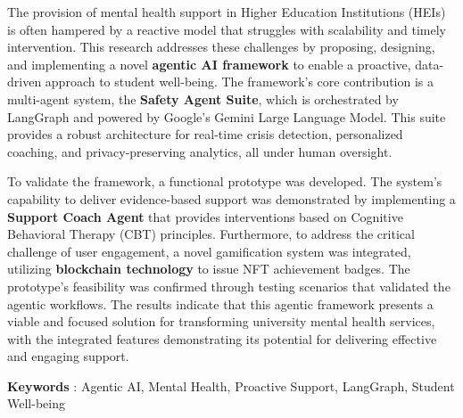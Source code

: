 	The provision of mental health support in Higher Education Institutions (HEIs) is often hampered by a reactive model that struggles with scalability and timely intervention. This research addresses these challenges by proposing, designing, and implementing a novel \textbf{agentic AI framework} to enable a proactive, data-driven approach to student well-being. The framework’s core contribution is a multi-agent system, the \textbf{Safety Agent Suite}, which is orchestrated by LangGraph and powered by Google’s Gemini Large Language Model. This suite provides a robust architecture for real-time crisis detection, personalized coaching, and privacy-preserving analytics, all under human oversight.

	To validate the framework, a functional prototype was developed. The system's capability to deliver evidence-based support was demonstrated by implementing a \textbf{Support Coach Agent} that provides interventions based on Cognitive Behavioral Therapy (CBT) principles. Furthermore, to address the critical challenge of user engagement, a novel gamification system was integrated, utilizing \textbf{blockchain technology} to issue NFT achievement badges. The prototype's feasibility was confirmed through testing scenarios that validated the agentic workflows. The results indicate that this agentic framework presents a viable and focused solution for transforming university mental health services, with the integrated features demonstrating its potential for delivering effective and engaging support.

\noindent\textbf{Keywords} : Agentic AI, Mental Health, Proactive Support, LangGraph, Student Well-being